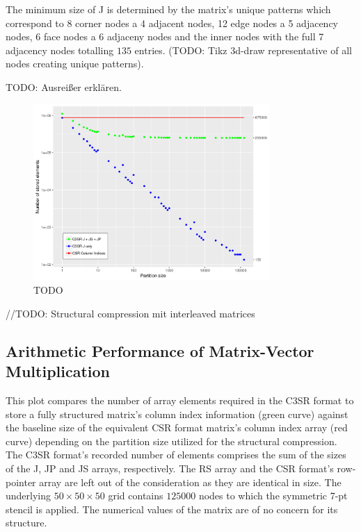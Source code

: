 \documentclass{article}
\begin{document}
    The minimum size of J is determined by the matrix's unique patterns which correspond to 8 corner
    nodes a 4 adjacent nodes, 12 edge nodes a 5 adjacency nodes, 6 face nodes a 6 adjaceny nodes and
    the inner nodes with the full 7 adjacency nodes totalling $135$ entries. (TODO: Tikz 3d-draw
    representative of all nodes creating unique patterns).

    TODO: Ausreißer erklären.
    \begin{figure}[ht]
      \centering
      \includegraphics[width=0.8\textwidth]{fig/structural-compression}
      \caption*{TODO}
    \end{figure}

    //TODO: Structural compression mit interleaved matrices

  \subsection{Arithmetic Performance of Matrix-Vector Multiplication}

    This plot compares the number of array elements required in the C3SR format to store a fully structured matrix's column index information (green curve) against the baseline size of the equivalent CSR format matrix's column index array (red curve) depending on the partition size utilized for the structural compression. The C3SR format's recorded number of elements comprises the sum of the sizes of the J, JP and JS arrays, respectively. The RS array and the CSR format's row-pointer array are left out of the consideration as they are identical in size. The underlying $50 \times 50 \times 50$ grid contains $125000$ nodes to which the symmetric 7-pt stencil is applied. The numerical values of the matrix are of no concern for its structure.
\end{document}

